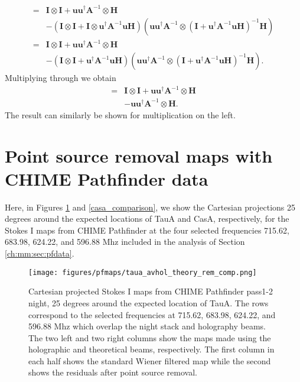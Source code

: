 \begin{align}
=& \mathbf{I} \otimes \mathbf{I} + \mathbf{u}\mathbf{u}^\dagger\mathbf{A}^{-1} \otimes \mathbf{H} 
\\ \nonumber &- \left( \mathbf{I} \otimes \mathbf{I} + \mathbf{I} \otimes \mathbf{u}^\dagger\mathbf{A}^{-1}\mathbf{u} \mathbf{H}\right)
 \left( \mathbf{u}\mathbf{u}^\dagger\mathbf{A}^{-1} \otimes \left(\mathbf{I} + \mathbf{u}^\dagger\mathbf{A}^{-1}\mathbf{u}\mathbf{H}\right)^{-1} \mathbf{H}\right)
\\ =& \mathbf{I} \otimes \mathbf{I} + \mathbf{u}\mathbf{u}^\dagger\mathbf{A}^{-1} \otimes \mathbf{H} 
\\ \nonumber &- \left( \mathbf{I} \otimes \mathbf{I} + \mathbf{u}^\dagger\mathbf{A}^{-1}\mathbf{u} \mathbf{H} \right)
 \left( \mathbf{u}\mathbf{u}^\dagger\mathbf{A}^{-1} \otimes \left(\mathbf{I} + \mathbf{u}^\dagger\mathbf{A}^{-1}\mathbf{u}\mathbf{H}\right)^{-1} \mathbf{H}\right).
 \end{align}
 Multiplying through we obtain
 \begin{align}
 =& \mathbf{I} \otimes \mathbf{I} + \mathbf{u}\mathbf{u}^\dagger\mathbf{A}^{-1} \otimes \mathbf{H} \nonumber 
\\ &- \mathbf{u}\mathbf{u}^\dagger\mathbf{A}^{-1} \otimes \mathbf{H}.
\end{align}
The result can similarly be shown for multiplication on the left.

\section{Point source removal maps with CHIME Pathfinder data}
\label{app:mm:sec:pfdata}

Here, in Figures \ref{taua_comparison}  and \ref{casa_comparison}, we show the Cartesian projections 25 degrees around the expected locations of TauA and CasA, respectively, for the Stokes I maps from CHIME Pathfinder at the four selected frequencies 715.62, 683.98, 624.22, and 596.88 Mhz included in the analysis of Section \ref{ch:mm:sec:pfdata}.

\begin{figure}
\centering
\texttt{[image: figures/pfmaps/taua\_avhol\_theory\_rem\_comp.png]}
\caption{Cartesian projected Stokes I maps from CHIME Pathfinder pass1-2 night, 25 degrees around the expected location of TauA. The rows correspond to the selected frequencies at 715.62, 683.98, 624.22, and 596.88 Mhz which overlap the night stack and holography beams. The two left and two right columns show the maps made using the holographic and theoretical beams, respectively. The first column in each half shows the standard Wiener filtered map while the second shows the residuals after point source removal.}
\label{taua_comparison}
\end{figure}

